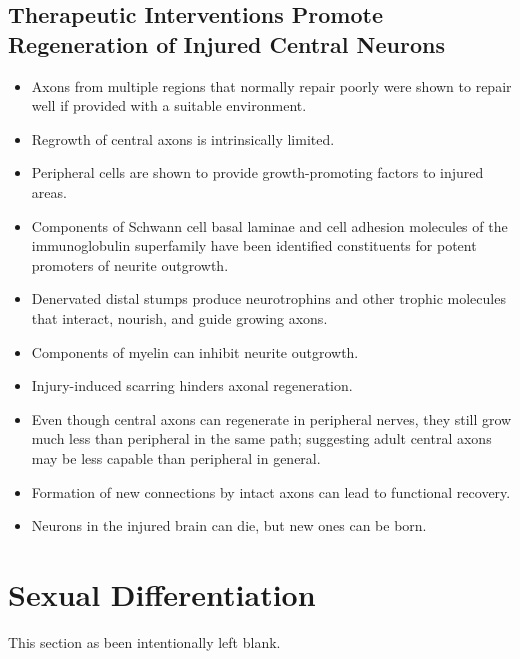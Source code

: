 \documentclass[12pt,a4paper]{article}
\begin{document}
\subsection{Therapeutic Interventions Promote Regeneration of Injured Central Neurons}
\begin{itemize}
    \item Axons from multiple regions that normally repair poorly were shown to repair well if provided with a suitable environment.
    \item Regrowth of central axons is intrinsically limited.
    \item Peripheral cells are shown to provide growth-promoting factors to injured areas. 
    \item Components of Schwann cell basal laminae and cell adhesion molecules of the immunoglobulin superfamily have been identified constituents for potent promoters of neurite outgrowth. 
    \item Denervated distal stumps produce neurotrophins and other trophic molecules that interact, nourish, and guide growing axons. 
    \item Components of myelin can inhibit neurite outgrowth.
    \item Injury-induced scarring hinders axonal regeneration.
    \item Even though central axons can regenerate in peripheral nerves, they still grow much less than peripheral in the same path; suggesting adult central axons may be less capable than peripheral in general. 
    \item Formation of new connections by intact axons can lead to functional recovery.
    \item Neurons in the injured brain can die, but new ones can be born.
\end{itemize}


\clearpage
\section{Sexual Differentiation}
This section as been intentionally left blank.

\clearpage
\end{document}
